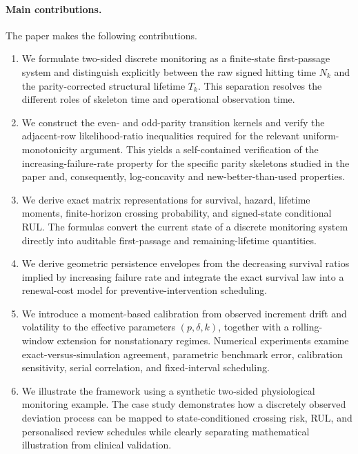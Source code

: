 \documentclass[pdflatex,sn-mathphys-num]{sn-jnl}
\theoremstyle{definition}
\numberwithin{equation}{section}
\begin{document}
\paragraph{Main contributions.}
The paper makes the following contributions.
\begin{enumerate}[label=(\roman*)]

\item We formulate two-sided discrete monitoring as a finite-state
first-passage system and distinguish explicitly between the raw signed hitting
time \(N_k\) and the parity-corrected structural lifetime \(T_k\). This
separation resolves the different roles of skeleton time and operational
observation time.

\item We construct the even- and odd-parity transition kernels and verify the
adjacent-row likelihood-ratio inequalities required for the relevant
uniform-monotonicity argument. This yields a self-contained verification of the
increasing-failure-rate property for the specific parity skeletons studied in
the paper and, consequently, log-concavity and new-better-than-used properties.

\item We derive exact matrix representations for survival, hazard, lifetime
moments, finite-horizon crossing probability, and signed-state conditional RUL.
The formulas convert the current state of a discrete monitoring system directly
into auditable first-passage and remaining-lifetime quantities.

\item We derive geometric persistence envelopes from the decreasing survival
ratios implied by increasing failure rate and integrate the exact survival law
into a renewal-cost model for preventive-intervention scheduling.

\item We introduce a moment-based calibration from observed increment drift
and volatility to the effective parameters \((p,\delta,k)\), together with a
rolling-window extension for nonstationary regimes. Numerical experiments
examine exact-versus-simulation agreement, parametric benchmark error,
calibration sensitivity, serial correlation, and fixed-interval scheduling.

\item We illustrate the framework using a synthetic two-sided physiological
monitoring example. The case study demonstrates how a discretely observed
deviation process can be mapped to state-conditioned crossing risk, RUL, and
personalised review schedules while clearly separating mathematical
illustration from clinical validation.

\end{enumerate}
\end{document}
